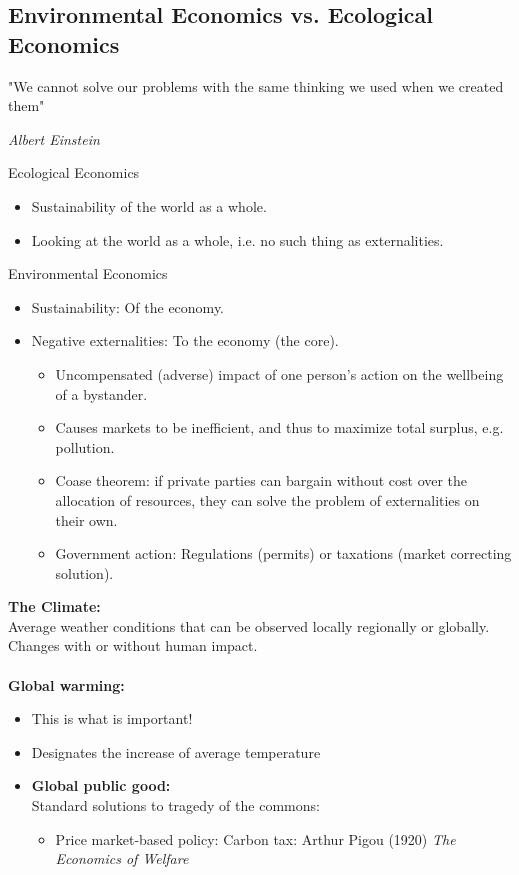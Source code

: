 \begin{multicols}{2}
 \subsection{Environmental Economics vs. Ecological Economics}
 \epigraph{"We cannot solve our problems with the same thinking we used when we created them"}{\textit{Albert Einstein}}
 \noindent
 Ecological Economics
 \begin{itemize}
  \item Sustainability of the world as a whole.
  \item Looking at the world as a whole, i.e. no such thing as externalities.
 \end{itemize}
 Environmental Economics
 \begin{itemize}
  \item Sustainability: Of the economy.
  \item Negative externalities: To the economy (the core).
        \begin{itemize}
         \item Uncompensated (adverse) impact of one person's action on the wellbeing of a bystander.
         \item Causes markets to be inefficient, and thus to maximize total surplus, e.g. pollution.
         \item Coase theorem: if private parties can bargain without cost over the allocation of resources, they can solve the problem of externalities on their own.
         \item Government action: Regulations (permits) or taxations (market correcting solution).
        \end{itemize}
 \end{itemize}
 \noindent
 \textbf{The Climate:}\\
 Average weather conditions that can be observed locally regionally or globally. Changes with or without human impact.
 \\ \\
 \textbf{Global warming:}
 \begin{itemize}
  \item This is what is important!
  \item Designates the increase of average temperature
  \item \textbf{Global public good:}\\
        Standard solutions to tragedy of the commons:
        \begin{itemize}
         \item Price market-based policy: Carbon tax: Arthur Pigou (1920) \textit{The Economics of Welfare}

\end{itemize}
\end{itemize}
\end{multicols}
